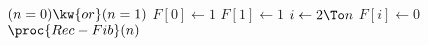 \begin{codebox}
\li \If $(n = 0) \kw{ or }(n = 1)$
\li	\Then
	\End
\li	$F[0] \gets 1$
\li	$F[1] \gets 1$ 
\li \For $i \gets 2 \To n$
\li \Do
		$F[i] \gets 0$
	\End
\li \Return $\proc{Rec-Fib}(n)$
\end{codebox}